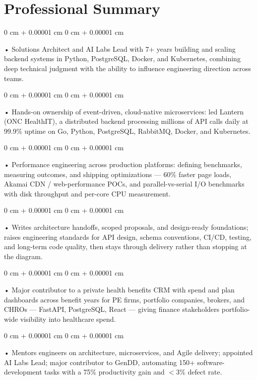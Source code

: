 \documentclass[10pt, letterpaper]{article}
\newenvironment{onecolentry}{
    \begin{adjustwidth}{
        0 cm + 0.00001 cm
    }{
        0 cm + 0.00001 cm
    }
}{
    \end{adjustwidth}
} %
\begin{document}
    \section{Professional Summary}
        \vspace{2 pt }
        \begin{onecolentry}
            • Solutions Architect and AI Labs Lead with 7+ years building and scaling backend systems in Python, PostgreSQL, Docker, and Kubernetes, combining deep technical judgment with the ability to influence engineering direction across teams.
        \end{onecolentry}
        \begin{onecolentry}
            • Hands-on ownership of event-driven, cloud-native microservices: led Lantern (ONC HealthIT), a distributed backend processing millions of API calls daily at 99.9\% uptime on Go, Python, PostgreSQL, RabbitMQ, Docker, and Kubernetes.
        \end{onecolentry}
        \begin{onecolentry}
            • Performance engineering across production platforms: defining benchmarks, measuring outcomes, and shipping optimizations --- 60\% faster page loads, Akamai CDN / web-performance POCs, and parallel-vs-serial I/O benchmarks with disk throughput and per-core CPU measurement.
        \end{onecolentry}
        \begin{onecolentry}
            • Writes architecture handoffs, scoped proposals, and design-ready foundations; raises engineering standards for API design, schema conventions, CI/CD, testing, and long-term code quality, then stays through delivery rather than stopping at the diagram.
        \end{onecolentry}
        \begin{onecolentry}
            • Major contributor to a private health benefits CRM with spend and plan dashboards across benefit years for PE firms, portfolio companies, brokers, and CHROs --- FastAPI, PostgreSQL, React --- giving finance stakeholders portfolio-wide visibility into healthcare spend.
        \end{onecolentry}
        \begin{onecolentry}
            • Mentors engineers on architecture, microservices, and Agile delivery; appointed AI Labs Lead; major contributor to GenDD, automating 150+ software-development tasks with a 75\% productivity gain and $<$3\% defect rate.
        \end{onecolentry}
\end{document}
